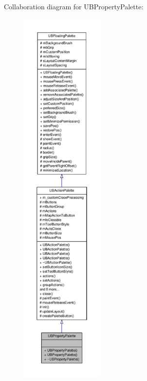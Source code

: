 Collaboration diagram for U\-B\-Property\-Palette\-:
\nopagebreak
\begin{figure}[H]
\begin{center}
\leavevmode
\includegraphics[height=550pt]{d9/dd1/class_u_b_property_palette__coll__graph}
\end{center}
\end{figure}
